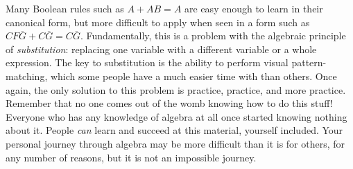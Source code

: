 Many Boolean rules such as $A + AB = A$ are easy enough to learn in their canonical form, but more difficult to apply when seen in a form such as $CF\overline{G} + C \overline{G} = C \overline{G}$.  Fundamentally, this is a problem with the algebraic principle of {\it substitution}: replacing one variable with a different variable or a whole expression.  The key to substitution is the ability to perform visual pattern-matching, which some people have a much easier time with than others.  Once again, the only solution to this problem is practice, practice, and more practice.  Remember that no one comes out of the womb knowing how to do this stuff!  Everyone who has any knowledge of algebra at all once started knowing nothing about it.  People {\it can} learn and succeed at this material, yourself included.  Your personal journey through algebra may be more difficult than it is for others, for any number of reasons, but it is not an impossible journey.


